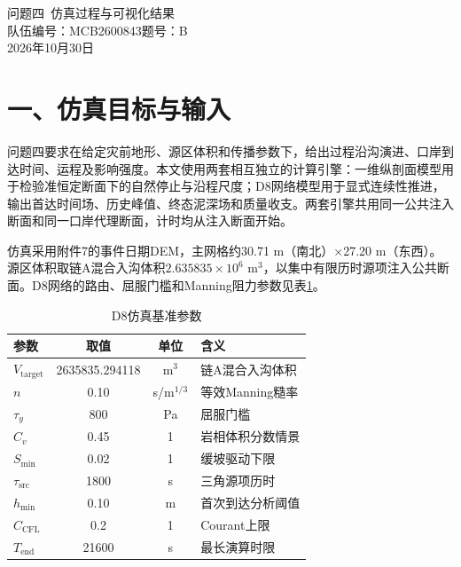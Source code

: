 \documentclass[11pt,a4paper]{ctexart}
\begin{document}
\begin{center}
{\heiti 问题四\ 仿真过程与可视化结果}\\[6pt]
{队伍编号：MCB2600843\quad 题号：B}\\[2pt]
{2026年10月30日}
\end{center}

\vspace{0.5em}

\section*{一、仿真目标与输入}
问题四要求在给定灾前地形、源区体积和传播参数下，给出过程沿沟演进、口岸到达时间、运程及影响强度。本文使用两套相互独立的计算引擎：一维纵剖面模型用于检验准恒定断面下的自然停止与沿程尺度；D8网络模型用于显式连续性推进，输出首达时间场、历史峰值、终态泥深场和质量收支。两套引擎共用同一公共注入断面和同一口岸代理断面，计时均从注入断面开始。

仿真采用附件7的事件日期DEM，主网格约30.71 m（南北）×27.20 m（东西）。源区体积取链A混合入沟体积$2.635835\times10^6$ m$^3$，以集中有限历时源项注入公共断面。D8网络的路由、屈服门槛和Manning阻力参数见表\ref{tab:params}。

\begin{table}[H]\centering\small
\caption{D8仿真基准参数}\label{tab:params}
\begin{tabular}{@{}l c c l@{}}
\toprule
参数&取值&单位&含义\\
\midrule
$V_{\mathrm{target}}$&2635835.294118&m$^3$&链A混合入沟体积\\
$n$&0.10&s/m$^{1/3}$&等效Manning糙率\\
$\tau_y$&800&Pa&屈服门槛\\
$C_v$&0.45&1&岩相体积分数情景\\
$S_{\min}$&0.02&1&缓坡驱动下限\\
$\tau_{\mathrm{src}}$&1800&s&三角源项历时\\
$h_{\min}$&0.10&m&首次到达分析阈值\\
$C_{\mathrm{CFL}}$&0.2&1&Courant上限\\
$T_{\mathrm{end}}$&21600&s&最长演算时限\\
\bottomrule
\end{tabular}
\end{table}
\end{document}
